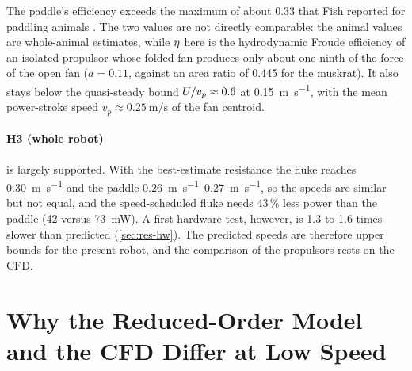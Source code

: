 The paddle's efficiency exceeds the maximum of about 0.33 that Fish reported for paddling animals \cite{Fish1984,Fish1996}. The two
values are not directly comparable: the animal values are whole-animal estimates, while $\eta$ here is the hydrodynamic Froude
efficiency of an isolated propulsor whose folded fan produces only about one ninth of the force of the open fan ($a=0.11$, against an area ratio of 0.445 for the muskrat). It also
stays below the quasi-steady bound $U/v_p\approx0.6$ at \SI{0.15}{\metre\per\second}, with the mean power-stroke speed
$v_p\approx\SI{0.25}{\metre\per\second}$ of the fan centroid.

\paragraph{H3 (whole robot)} is largely supported. With the best-estimate resistance the fluke reaches \SI{0.30}{\metre\per\second}
and the paddle \SIrange{0.26}{0.27}{\metre\per\second}, so the speeds are similar but not equal, and the speed-scheduled fluke needs
43\,\% less power than the paddle (\SI{42}{} versus \SI{73}{\milli\watt}). A first hardware test, however, is 1.3 to 1.6 times slower than predicted (\cref{sec:res-hw}). The predicted speeds are therefore upper bounds for the present robot, and the comparison
of the propulsors rests on the CFD.

\section{Why the Reduced-Order Model and the CFD Differ at Low Speed}
\label{sec:disc-models}

